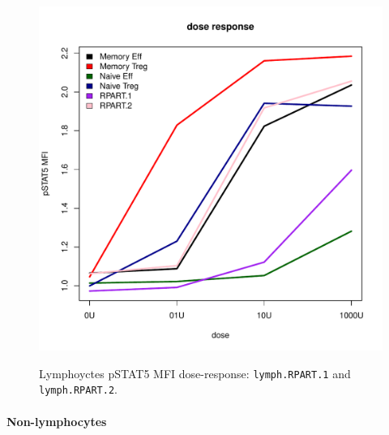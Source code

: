 \begin{figure}
{}
%
\begin{minipage}{.5\textwidth}
  \includegraphics[scale=.4]{figures/rpart-lymphocytes-dose-response}
\end{minipage}
\begin{minipage}{.3\textwidth}
{  Lymphoyctes pSTAT5 MFI dose-response: \texttt{lymph.RPART.1} and \texttt{lymph.RPART.2}. }
{
}
\end{minipage}
\end{figure}

\clearpage


\paragraph{Non-lymphocytes}

